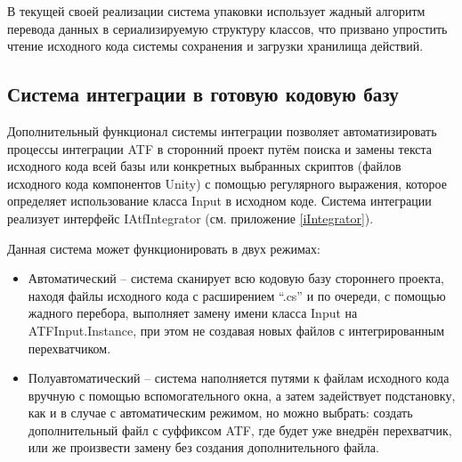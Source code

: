 В текущей своей реализации система упаковки использует жадный алгоритм перевода данных в сериализируемую структуру классов, что призвано упростить чтение исходного кода системы сохранения и загрузки хранилища действий.

\subsection{Система интеграции в готовую кодовую базу}
Дополнительный функционал системы интеграции позволяет автоматизировать процессы интеграции ATF в сторонний проект путём поиска и замены текста исходного кода всей базы или конкретных выбранных скриптов (файлов исходного кода компонентов Unity) с помощью регулярного выражения, которое определяет использование класса Input в исходном коде. Система интеграции реализует интерфейс IAtfIntegrator (см. приложение \ref{iIntegrator}).

Данная система может функционировать в двух режимах:
\begin{itemize}
	\item Автоматический -- система сканирует всю кодовую базу стороннего проекта, находя файлы исходного кода с расширением ``.cs'' и по очереди, с помощью жадного перебора, выполняет замену имени класса Input на ATFInput.Instance, при этом не создавая новых файлов с интегрированным перехватчиком.
	\item Полуавтоматический -- система наполняется путями к файлам исходного кода вручную с помощью вспомогательного окна, а затем задействует подстановку, как и в случае с автоматическим режимом, но можно выбрать: создать дополнительный файл с суффиксом ATF, где будет уже внедрён перехватчик, или же произвести замену без создания дополнительного файла.
\end{itemize}
